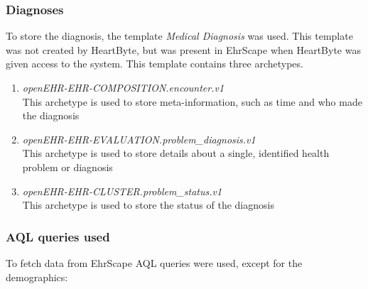 \documentclass{article}
\begin{document}
\subsubsection{Diagnoses}
To store the diagnosis, the template \emph{Medical Diagnosis} was used. This template was not created by HeartByte, but was present in EhrScape when HeartByte was given access to the system. This template contains three archetypes.

\begin{enumerate}[label=(\roman*)]
\item \emph{openEHR-EHR-COMPOSITION.encounter.v1} \\
This archetype is used to store meta-information, such as time and who made the diagnosis
\item \emph{openEHR-EHR-EVALUATION.problem\_diagnosis.v1} \\
This archetype is used to store details about a single, identified health problem or diagnosis
\item \emph{openEHR-EHR-CLUSTER.problem\_status.v1} \\
This archetype is used to store the status of the diagnosis
\end{enumerate}


\subsubsection{AQL queries used}
To fetch data from EhrScape AQL queries were used, except for the demographics:
\end{document}
